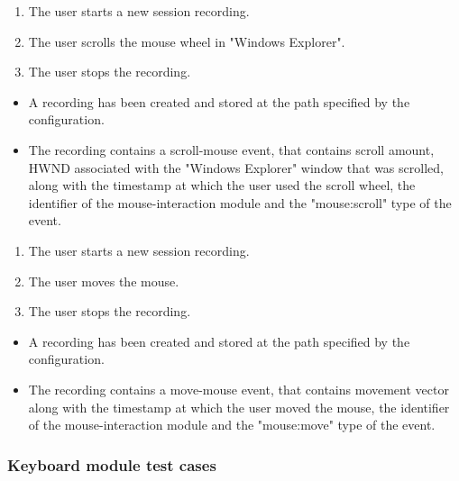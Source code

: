 \begin{tests}
	{\begin{enumerate}
		\item The \gls{user} starts a new session recording.
		\item The \gls{user} scrolls the mouse wheel in "Windows Explorer".
		\item The \gls{user} stops the recording.
	\end{enumerate}}
	{\begin{itemize}
		\item A recording has been created and stored at the path specified by the configuration.
		\item The recording contains a scroll-mouse event, that contains scroll amount, HWND associated with the "Windows Explorer" window that was scrolled, along with the timestamp at which the user used the scroll wheel, the identifier of the mouse-interaction module and the "mouse:scroll" type of the event.
	\end{itemize}}
	
	{\begin{enumerate}
		\item The \gls{user} starts a new session recording.
		\item The \gls{user} moves the mouse.
		\item The \gls{user} stops the recording.
	\end{enumerate}}
	{\begin{itemize}
		\item A recording has been created and stored at the path specified by the configuration.
		\item The recording contains a move-mouse event, that contains movement vector along with the timestamp at which the user moved the mouse, the identifier of the mouse-interaction module and the "mouse:move" type of the event.
	\end{itemize}}
\end{tests}

\subsubsection{Keyboard module test cases}

